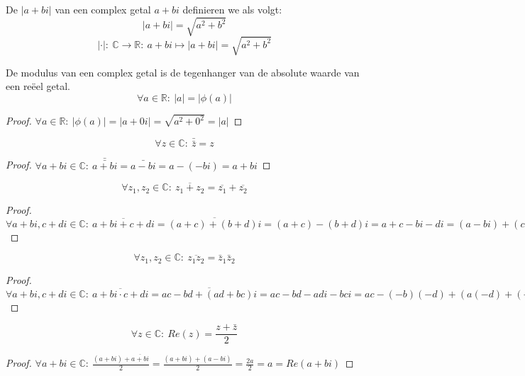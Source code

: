 \documentclass[main.tex]{subfiles}
\begin{document}
\begin{de}
  De  $|a+bi|$ van een complex getal $a+bi$ definieren we als volgt:
  \[ |a+bi| = \sqrt{a^{2}+b^{2}} \]
  \[ |\cdot|:\ \mathbb{C} \rightarrow \mathbb{R}:\ a+bi \mapsto |a+bi| = \sqrt{a^{2}+b^{2}} \]
\end{de}

\begin{ei}
  De modulus van een complex getal is de tegenhanger van de absolute waarde van een re\"eel getal.
  \[ \forall a \in \mathbb{R}:\ |a| = |\phi(a)| \]
  \begin{proof}
    $\forall a\in \mathbb{R}:\ |\phi(a)| = |a+0i| = \sqrt{a^{2} + 0^{2}} = |a|$
  \end{proof}
\end{ei}

\begin{pr}
  \[ \forall z\in \mathbb{C}:\ \bar{\bar{z}} = z \]

  \begin{proof}
    $\forall a+bi\in \mathbb{C}:\ \bar{\bar{a+bi}} = \bar{a-bi} = a-(-bi) = a+bi$
  \end{proof}
\end{pr}

\begin{pr}
  \[ \forall z_{1},z_{2}\in \mathbb{C}:\ \overline{z_{1}+z_{2}} = \overline{z_{1}} + \overline{z_{2}} \]

  \begin{proof}
    $\forall a+bi,c+di \in \mathbb{C}:\ \overline{a+bi + c+di} = \overline{(a+c)+(b+d)i} =(a+c)-(b+d)i = a+c-bi-di = (a-bi) + (c-di)$
  \end{proof}
\end{pr}

\begin{pr}
  \[ \forall z_{1},z_{2}\in \mathbb{C}:\ \overline{z_{1}z_{2}} = \bar{z}_{1}  \bar{z}_{2} \]

  \begin{proof}
    $\forall a+bi,c+di \in \mathbb{C}:\ \overline{a+bi \cdot c+di} = \overline{ac-bd + (ad+bc)i} = ac-bd - adi - bci = ac-(-b)(-d) + (a(-d)+(-b)c)i = \overline{a+bi} \cdot \overline{c+di} $
  \end{proof}
\end{pr}

\begin{pr}
  \[ \forall z\in \mathbb{C}:\ Re(z) = \frac{z+\bar{z}}{2} \]

  \begin{proof}
    $\forall a+bi\in \mathbb{C}:\ \frac{(a+bi)+\overline{a+bi}}{2} = \frac{(a+bi)+(a-bi)}{2} = \frac{2a}{2} = a = Re(a+bi)$
  \end{proof}
\end{pr}
\end{document}
